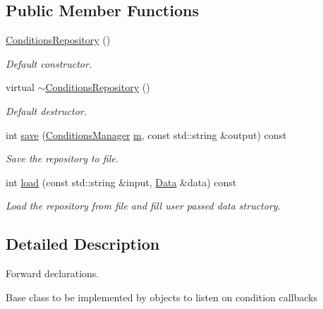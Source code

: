 \subsection*{Public Member Functions}
\begin{DoxyCompactItemize}
\item 
\hyperlink{class_d_d4hep_1_1_conditions_1_1_conditions_repository_aaf9d3a63aa6f596610104cbc1af2897a}{Conditions\+Repository} ()
\begin{DoxyCompactList}\small\item\em Default constructor. \end{DoxyCompactList}\item 
virtual \hyperlink{class_d_d4hep_1_1_conditions_1_1_conditions_repository_a0c539a83a34e2a2fb3d0bab9586ec3e6}{$\sim$\+Conditions\+Repository} ()
\begin{DoxyCompactList}\small\item\em Default destructor. \end{DoxyCompactList}\item 
int \hyperlink{class_d_d4hep_1_1_conditions_1_1_conditions_repository_aa2e0e36827ddbe11bb180c9eda59ace4}{save} (\hyperlink{class_d_d4hep_1_1_conditions_1_1_conditions_manager}{Conditions\+Manager} \hyperlink{_volumes_8cpp_a6fc379aaec47ce424b00d8ffda2a6c59}{m}, const std\+::string \&output) const
\begin{DoxyCompactList}\small\item\em Save the repository to file. \end{DoxyCompactList}\item 
int \hyperlink{class_d_d4hep_1_1_conditions_1_1_conditions_repository_ab7c7c5e71f45e815010151e18c8e46c2}{load} (const std\+::string \&input, \hyperlink{class_d_d4hep_1_1_conditions_1_1_conditions_repository_a2a262d14363e0c6879677397dc595012}{Data} \&data) const
\begin{DoxyCompactList}\small\item\em Load the repository from file and fill user passed data structory. \end{DoxyCompactList}\end{DoxyCompactItemize}


\subsection{Detailed Description}
Forward declarations. 

Base class to be implemented by objects to listen on condition callbacks

